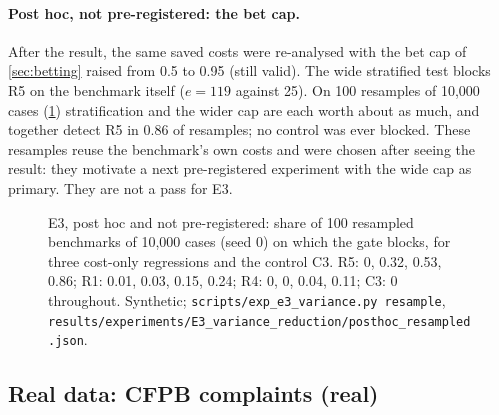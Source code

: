 \documentclass[11pt]{article}
\theoremstyle{definition}
\theoremstyle{remark}
\renewcommand{\P}{\mathbb{P}}
\newcommand{\1}{\mathbf{1}}
\begin{document}
\paragraph{Post hoc, not pre-registered: the bet cap.} After the result, the same saved costs were re-analysed with the bet cap of \cref{sec:betting} raised from 0.5 to 0.95 (still valid). The wide stratified test blocks R5 on the benchmark itself ($e=119$ against 25). On 100 resamples of 10{,}000 cases (\cref{fig:e3}) stratification and the wider cap are each worth about as much, and together detect R5 in 0.86 of resamples; no control was ever blocked. These resamples reuse the benchmark's own costs and were chosen after seeing the result: they motivate a next pre-registered experiment with the wide cap as primary. They are not a pass for E3.

\begin{figure}[t]
\centering
{}
\caption{E3, post hoc and not pre-registered: share of 100 resampled benchmarks of 10{,}000 cases (seed 0) on which the gate blocks, for three cost-only regressions and the control C3. R5: 0, 0.32, 0.53, 0.86; R1: 0.01, 0.03, 0.15, 0.24; R4: 0, 0, 0.04, 0.11; C3: 0 throughout. Synthetic; \texttt{scripts/exp\_e3\_variance.py resample}, \nolinkurl{results/experiments/E3_variance_reduction/posthoc_resampled.json}.}\label{fig:e3}
\end{figure}

\subsection{Real data: CFPB complaints (real)}
\end{document}
